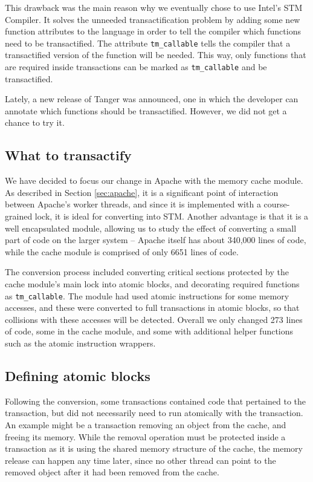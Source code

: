 \documentclass[preprint,11pt]{sigplanconf}
\begin{document}
This drawback was the main reason why we eventually chose to use Intel's STM
Compiler. It solves the unneeded transactification problem by adding some new function attributes
to the language in order to tell the compiler which functions need to be transactified.
The attribute {\tt tm\_callable} tells the compiler that a transactified version
of the function will be needed. This way, only functions that are required inside
transactions can be marked as {\tt tm\_callable} and be transactified.

Lately, a new release of {\sc Tanger} was announced, one in which the developer
can annotate which functions should be transactified. However, we did not get a
chance to try it.

\subsection{What to transactify}
We have decided to focus our change in Apache with the memory cache module. As
described in Section \ref{sec:apache}, it is a significant point of interaction
between Apache's worker threads, and since it is implemented with a course-grained
lock, it is ideal for converting into STM. Another advantage is that it is a
well encapsulated module, allowing us to study the effect of converting a small 
part of code on the larger system -- Apache itself has about 340,000 lines of
code, while the cache module is comprised of only 6651 lines of code.

The conversion process included converting critical sections protected by the
cache module's main lock into atomic blocks, and decorating required functions
as {\tt tm\_callable}. The module had used atomic instructions for some memory
accesses, and these were converted to full transactions in atomic blocks, so
that collisions with these accesses will be detected. Overall we only changed
273 lines of code, some in the cache module, and some with additional helper
functions such as the atomic instruction wrappers.

\subsection{Defining atomic blocks}
Following the conversion, some transactions contained code that pertained to
the transaction, but did not necessarily need to run atomically with the
transaction. An example might be a transaction removing an object from the
cache, and freeing its memory. While the removal operation must be protected
inside a transaction as it is using the shared memory structure of the cache,
the memory release can happen any time later, since no other thread can point to
the removed object after it had been removed from the cache. 
\end{document}
